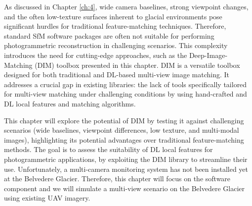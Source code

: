 As discussed in Chapter \ref{ch:4}, wide camera baselines, strong viewpoint changes, and the often low-texture surfaces inherent to glacial environments pose significant hurdles for traditional feature-matching techniques.
Therefore, standard SfM software packages are often not suitable for performing photogrammetric reconstruction in challenging scenarios.
This complexity introduces the need for cutting-edge approaches, such as the Deep-Image-Matching (DIM) toolbox presented in this chapter.
DIM is a versatile toolbox designed for both traditional and DL-based multi-view image matching. 
It addresses a crucial gap in existing libraries: the lack of tools specifically tailored for multi-view matching under challenging conditions by using hand-crafted and DL local features and matching algorithms.

This chapter will explore the potential of DIM by testing it against challenging scenarios (wide baselines, viewpoint differences, low texture, and multi-modal images), highlighting its potential advantages over traditional feature-matching methods.  
The goal is to assess the suitability of DL local features for photogrammetric applications, by exploiting the DIM library to streamline their use. 
Unfortunately, a multi-camera monitoring system has not been installed yet at the Belvedere Glacier. 
Therefore, this chapter will focus on the software component and we will simulate a multi-view scenario on the Belvedere Glacier using existing UAV imagery. 


